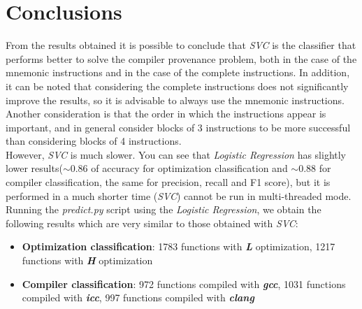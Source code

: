 \documentclass[11pt]{article}
\begin{document}
\section{Conclusions}
From the results obtained it is possible to conclude that \textit{SVC} is the classifier that performs better to solve the compiler provenance problem, both in the case of the mnemonic instructions and in the case of the complete instructions. In addition, it can be noted that considering the complete instructions does not significantly improve the results, so it is advisable to always use the mnemonic instructions. Another consideration is that the order in which the instructions appear is important, and in general consider blocks of 3 instructions to be more successful than considering blocks of 4 instructions. \\
However, \textit{SVC} is much slower. You can see that \textit{Logistic Regression} has slightly lower results($\sim$0.86 of accuracy  for optimization classification and $\sim$0.88 for compiler classification, the same for precision, recall and F1 score), but it is performed in a much shorter time (\textit{SVC}) cannot be run in multi-threaded mode. Running the \textit{predict.py} script using the \textit{Logistic Regression}, we obtain the following results which are very similar to those obtained with \textit{SVC}:
\begin{itemize}
	\item \textbf{Optimization classification}: 1783 functions with \textbf{\textit{L}} optimization, 1217 functions with \textbf{\textit{H}} optimization
	\item \textbf{Compiler classification}: 972 functions compiled with \textbf{\textit{gcc}}, 1031 functions compiled with \textbf{\textit{icc}}, 997 functions compiled with \textbf{\textit{clang}}
\end{itemize}
\end{document}
